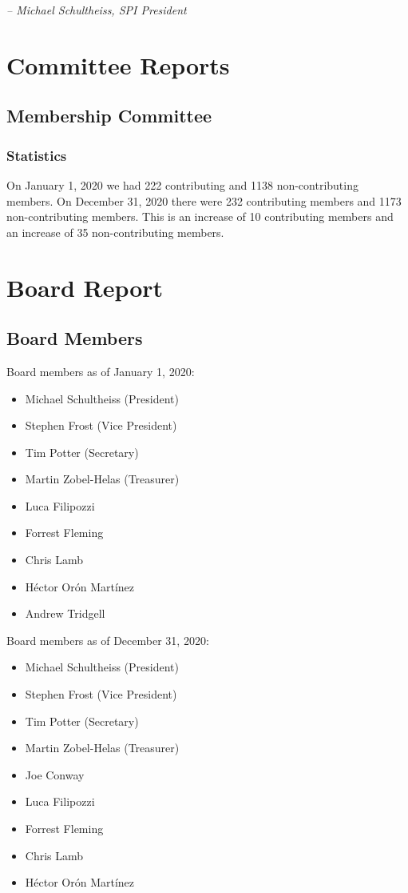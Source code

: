 \documentclass[a4paper]{report}
\begin{document}
  \emph{-- Michael Schultheiss, SPI President}

\chapter{Committee Reports}
\section{Membership Committee}

\subsection{Statistics}

On January 1, 2020 we had 222 contributing and 1138 non-contributing members.  On December 31, 2020 there were 232 contributing members and 1173 non-contributing members.  This is an increase of 10 contributing members and an increase of 35 non-contributing members.

\chapter{Board Report}
\section{Board Members}

Board members as of January 1, 2020:

\begin{itemize}
\item Michael Schultheiss (President)
\item Stephen Frost (Vice President)
\item Tim Potter (Secretary)
\item Martin Zobel-Helas (Treasurer)
\item Luca Filipozzi
\item Forrest Fleming
\item Chris Lamb
\item Héctor Orón Martínez
\item Andrew Tridgell
\end{itemize}

Board members as of December 31, 2020:

\begin{itemize}
\item Michael Schultheiss (President)
\item Stephen Frost (Vice President)
\item Tim Potter (Secretary)
\item Martin Zobel-Helas (Treasurer)
\item Joe Conway
\item Luca Filipozzi
\item Forrest Fleming
\item Chris Lamb
\item Héctor Orón Martínez
\end{itemize}
\end{document}
